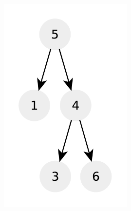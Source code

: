 \begin{figure}
	\vspace*{-0.5in}
	\centering
	\begin{subfigure}[t]{0.30\textwidth}
		\includegraphics[width=1\linewidth]{sources/verify_BST/images/example1}
		\label{fig:verify:example1}
	 \end{subfigure}
	\hfill
	\begin{subfigure}[t]{0.30\textwidth}

\end{subfigure}
\end{figure}

